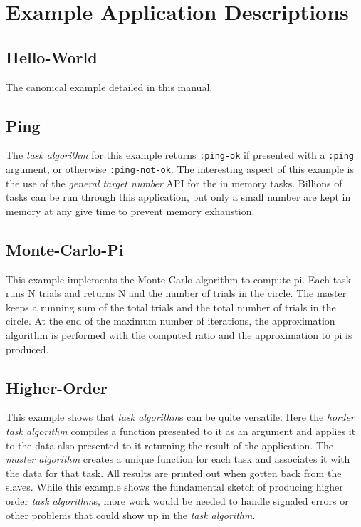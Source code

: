 \documentclass[titlepage,12pt]{book}
\newcommand{\ma}{\textit{master algorithm}\xspace}
\newcommand{\ta}{\textit{task algorithm}\xspace}
\newcommand{\tas}{\textit{task algorithm}s\xspace}
\newcommand{\keyword}[1]{\texttt{:#1}\xspace}
\begin{document}

\appendix

\chapter{Example Application Descriptions}

\section{Hello-World}
The canonical example detailed in this manual.

\section{Ping}
The \ta for this example returns \keyword{ping-ok} if presented with
a \keyword{ping} argument, or otherwise \keyword{ping-not-ok}. The
interesting aspect of this example is the use of the \emph{general
target number} API for the in memory tasks. Billions of tasks can
be run through this application, but only a small number are kept in
memory at any give time to prevent memory exhaustion.

\section{Monte-Carlo-Pi}
This example implements the Monte Carlo algorithm to compute pi. Each
task runs N trials and returns N and the number of trials in the
circle. The master keeps a running sum of the total trials and the
total number of trials in the circle. At the end of the maximum
number of iterations, the approximation algorithm is performed with
the computed ratio and the approximation to pi is produced.

\section{Higher-Order}
This example shows that \tas can be quite versatile. Here the
\textit{horder} \ta compiles a function presented to it as an argument
and applies it to the data also presented to it returning the result
of the application. The \ma creates a unique function for each task
and associates it with the data for that task. All results are printed
out when gotten back from the slaves. While this example shows the
fundamental sketch of producing higher order \tas, more work would
be needed to handle signaled errors or other problems that could show
up in the \ta.
\end{document}
